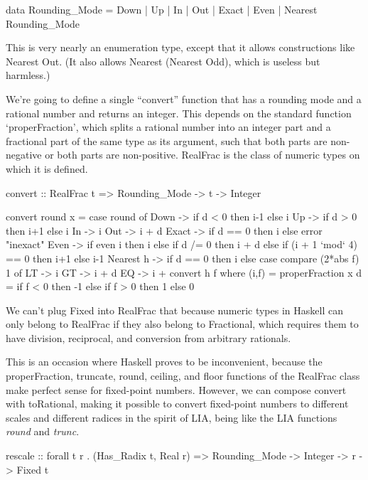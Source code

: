 \documentclass{article}
\begin{document}
\begin{code}
\begin{code}
data Rounding_Mode
   = Down
   | Up
   | In
   | Out
   | Exact
   | Even
   | Nearest Rounding_Mode
\end{code}

This is very nearly an enumeration type, except that it
allows constructions like Nearest Out.  (It also allows
Nearest (Nearest Odd), which is useless but harmless.)

We're going to define a single ``convert'' function that has
a rounding mode and a rational number and returns an integer.
This depends on the standard function `properFraction',
which splits a rational number into an integer part and
a fractional part of the same type as its argument, such
that both parts are non-negative or both parts are non-positive.
RealFrac is the class of numeric types on which it is defined.

\begin{code}
convert :: RealFrac t => Rounding_Mode -> t -> Integer

convert round x =
  case round of
    Down      -> if d < 0 then i-1 else i
    Up        -> if d > 0 then i+1 else i
    In        -> i
    Out       -> i + d
    Exact     -> if d == 0 then i else error "inexact"
    Even      -> if even i then i else
                 if d /= 0 then i + d else
                 if (i + 1 `mod` 4) == 0 then i+1 else i-1
    Nearest h -> if d == 0 then i else
                 case compare (2*abs f) 1 of
                   LT -> i
                   GT -> i + d
                   EQ -> i + convert h f
  where (i,f) = properFraction x
        d     = if f < 0 then -1 else if f > 0 then 1 else 0
\end{code}

We can't plug Fixed into RealFrac that because numeric types
in Haskell can only belong to RealFrac if they also belong to
Fractional, which requires them to have division, reciprocal,
and conversion from arbitrary rationals.

This is an occasion where Haskell proves to be inconvenient,
because the properFraction, truncate, round, ceiling, and floor
functions of the RealFrac class make perfect sense for
fixed-point numbers.  However, we can compose convert with
toRational, making it possible to convert fixed-point numbers
to different scales and different radices in the spirit of LIA,
being like  the LIA functions {\it round} and {\it trunc}.

\begin{code}
rescale :: forall t r . (Has_Radix t, Real r) =>
          Rounding_Mode -> Integer -> r -> Fixed t


\end{code}
\end{code}
\end{document}
